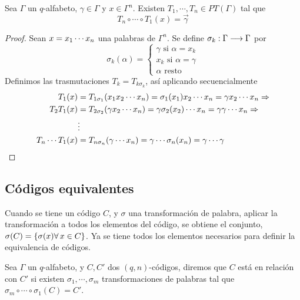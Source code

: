 \begin{lemma}
	\label{res:palabra-transforma-cero}
	Sea $\Gamma$ un $q$-alfabeto, $\gamma\in\Gamma$ y $x\in\Gamma^n$.
	Existen $T_1,\cdots,T_n\in PT(\Gamma)$ tal que
	\[
		T_n\circ\cdots\circ T_1(x)=\vec{\gamma}
	\]
\end{lemma}
\begin{proof}
	Sean $x=x_1\cdots x_{n}$ una palabras de $\Gamma^n$.
	Se define $\sigma_k:\Gamma\longrightarrow \Gamma$ por
	\[\sigma_k(\alpha)=\begin{cases}
		              \gamma \text{ si } \alpha = x_k\\
		              x_k \text{ si } \alpha = \gamma\\
		              \alpha \text{ resto }
	\end{cases}
	\]
	Definimos las trasmutaciones $T_k=T_{k\sigma_k}$, así aplicando secuencialmente
	\begin{align*}
		T_1(x)&=T_{1\sigma_1}(x_1 x_2\cdots x_n)=\sigma_1(x_1)x_2\cdots x_n=\gamma x_2\cdots x_n\Rightarrow\\
		T_2T_1(x)&=T_{2\sigma_2}(\gamma x_2\cdots x_n)=\gamma\sigma_2(x_2)\cdots x_n=\gamma \gamma\cdots x_n\Rightarrow\\
		&\vdots \\
		T_n\cdots T_1(x)&=T_{n\sigma_n}(\gamma\cdots x_n)=\gamma\cdots\sigma_n(x_n)=\gamma\cdots \gamma
	\end{align*}
\end{proof}

\subsection{Códigos equivalentes}
Cuando se tiene un código $C$, y $\sigma$ una transformación de palabra, aplicar la transformación a todos los elementos del código, se obtiene el conjunto, $\sigma(C)=\set{\sigma(x) \forall x\in C}$.
Ya se tiene todos los elementos necesarios para definir la equivalencia de códigos.
\begin{definition}
	\label{def:codigo-equivalente}
	Sea $\Gamma$ un $q$-alfabeto, y $C,C'$ dos $(q, n)$-códigos, diremos que $C$ está en relación con $C'$ si existen $\sigma_1,\cdots,\sigma_m$ transformaciones de palabras tal que $\sigma_m\circ\cdots\circ \sigma_1(C)= C'$.
\end{definition}

